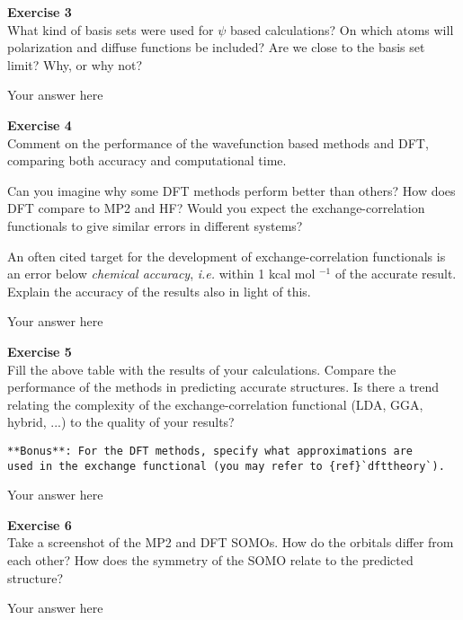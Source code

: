 \documentclass{article}
\begin{document}
\begin{mdframed}
\textbf{Exercise 3}\\
What kind of basis sets were used for $\psi$ based calculations? On which atoms will polarization and diffuse functions be included? Are we close to the basis set limit? Why, or why not?
\end{mdframed}

Your answer here

\begin{mdframed}
\textbf{Exercise 4}\\
Comment on the performance of the wavefunction based methods and DFT, comparing both accuracy and computational time.

Can you imagine why some DFT methods perform better than others? How does DFT compare to MP2 and HF?
Would you expect the exchange-correlation functionals to give similar errors in different systems?

An often cited target for the development of exchange-correlation functionals is an error below \textit{chemical accuracy}, \textit{i.e.} within 1
kcal mol $^{ -1}$ of the accurate result. Explain the accuracy of the results also in light of this.
\end{mdframed}

Your answer here

\begin{mdframed}
\textbf{Exercise 5}\\
Fill the above table with the results of your calculations. Compare the performance of the methods in predicting accurate
structures.     Is there a trend relating the complexity of the exchange-correlation functional (LDA, GGA, hybrid, ...) to the quality of your results?

\begin{verbatim}
**Bonus**: For the DFT methods, specify what approximations are
used in the exchange functional (you may refer to {ref}`dfttheory`).
\end{verbatim}
\end{mdframed}

Your answer here

\begin{mdframed}
\textbf{Exercise 6}\\
Take a screenshot of the MP2 and DFT SOMOs. How do the orbitals differ from each other? How does the symmetry of the SOMO relate to the predicted structure?
\end{mdframed}

Your answer here
\end{document}
